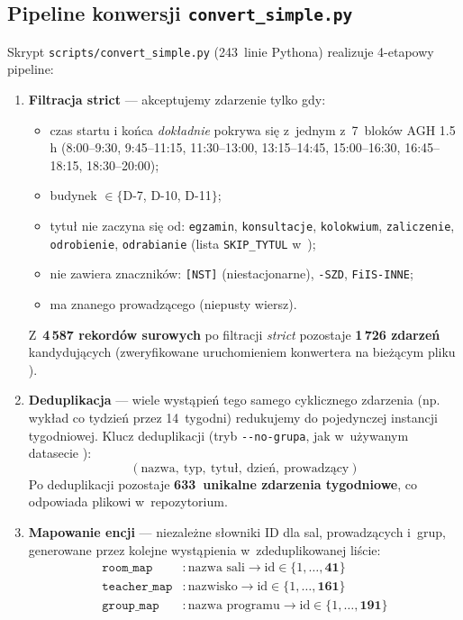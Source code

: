 \documentclass{common/sprawozdanie-agh}
\begin{document}
\subsection{Pipeline konwersji \texttt{convert\_simple.py}}

Skrypt \texttt{scripts/convert\_simple.py} (243~linie Pythona) realizuje 4-etapowy pipeline:

\begin{enumerate}
\item \textbf{Filtracja strict} --- akceptujemy zdarzenie tylko gdy:
\begin{itemize}\small
    \item czas startu i końca \emph{dokładnie} pokrywa się z~jednym z~7~bloków AGH 1.5\,h (8:00--9:30, 9:45--11:15, 11:30--13:00, 13:15--14:45, 15:00--16:30, 16:45--18:15, 18:30--20:00);
    \item budynek $\in \{$D-7, D-10, D-11$\}$;
    \item tytuł nie zaczyna się od: \texttt{egzamin}, \texttt{konsultacje}, \texttt{kolokwium}, \texttt{zaliczenie}, \texttt{odrobienie}, \texttt{odrabianie} (lista \texttt{SKIP\_TYTUL} w~);
    \item nie zawiera znaczników: \texttt{[NST]} (niestacjonarne), \texttt{-SZD}, \texttt{FiIS-INNE};
    \item ma znanego prowadzącego (niepusty wiersz).
\end{itemize}
Z~\textbf{4\,587 rekordów surowych} po filtracji \emph{strict} pozostaje \textbf{1\,726 zdarzeń} kandydujących (zweryfikowane uruchomieniem konwertera na bieżącym pliku ).

\item \textbf{Deduplikacja} --- wiele wystąpień tego samego cyklicznego zdarzenia (np. wykład co tydzień przez 14~tygodni) redukujemy do pojedynczej instancji tygodniowej. Klucz deduplikacji (tryb \texttt{-{}-no-grupa}, jak w~używanym datasecie ):
\[ (\text{nazwa},\ \text{typ},\ \text{tytuł},\ \text{dzień},\ \text{prowadzący}) \]
Po deduplikacji pozostaje \textbf{633~unikalne zdarzenia tygodniowe}, co odpowiada plikowi  w~repozytorium.

\item \textbf{Mapowanie encji} --- niezależne słowniki ID dla sal, prowadzących i~grup, generowane przez kolejne wystąpienia w~zdeduplikowanej liście:
\[
\begin{aligned}
\texttt{room\_map}    &: \text{nazwa sali} \to \text{id} \in \{1,\ldots,\mathbf{41}\} \\
\texttt{teacher\_map} &: \text{nazwisko}   \to \text{id} \in \{1,\ldots,\mathbf{161}\} \\
\texttt{group\_map}   &: \text{nazwa programu} \to \text{id} \in \{1,\ldots,\mathbf{191}\}
\end{aligned}
\]


\end{enumerate}
\end{document}
